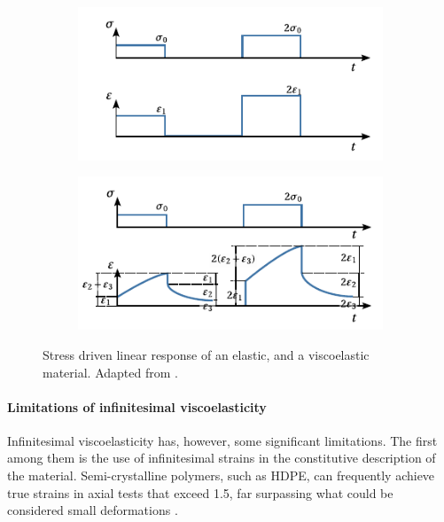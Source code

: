 \begin{figure}[hbtp]
\centering
\begin{subfigure}[b]{0.49\textwidth}
            \centering
            \includegraphics[width=\textwidth]{figures/elastic_linearity}
            \caption{}
            \label{subfig:elastic_linearity}
    \end{subfigure} \hfill
    \begin{subfigure}[b]{0.49\textwidth}
            \centering
            \includegraphics[width=\textwidth]{figures/viscoelastic_linearity}
            \caption{}
            \label{subfig:viscoelastic_linearity}
    \end{subfigure}
  \caption{Stress driven linear response of  an elastic, and  a viscoelastic material. Adapted from \cite{wardIntroductionMechanicalProperties2004}.}
\label{fig:linearity}
\end{figure}

\paragraph{Limitations of infinitesimal viscoelasticity}
Infinitesimal viscoelasticity has, however, some significant limitations.
The first among them is the use of infinitesimal strains in the constitutive description of the material.
Semi-crystalline polymers, such as HDPE, can frequently achieve true strains in axial tests that exceed 1.5, far surpassing what could be considered small deformations \citep{gsellYieldTransientEffects1981}.

